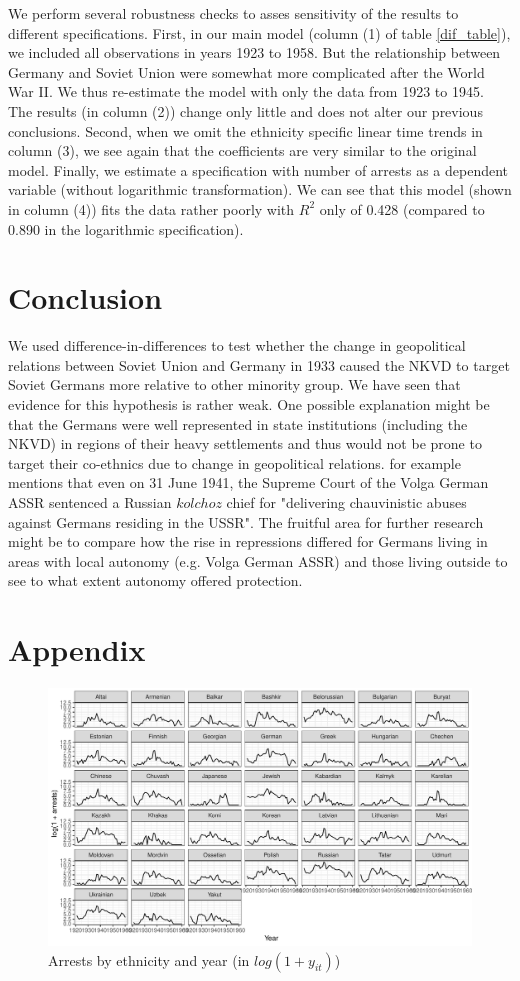 \documentclass[11pt]{article}
\begin{document}
We perform several robustness checks to asses sensitivity of the results to different specifications. First, in our main model (column (1) of table \ref{dif_table}), we included all observations in years 1923 to 1958. But the relationship between Germany and Soviet Union were somewhat more complicated after the World War II. We thus re-estimate the model with only the data from 1923 to 1945. The results (in column (2)) change only little and does not alter our previous conclusions. Second, when we omit the ethnicity specific linear time trends in column (3), we see again that the coefficients are very similar to the original model. 
Finally, we estimate a specification with number of arrests as a dependent variable (without logarithmic transformation). We can see that this model (shown in column (4)) fits the data rather poorly with  $R^2$ only of 0.428 (compared to 0.890 in the logarithmic specification). 
\section{Conclusion}
We used difference-in-differences to test whether the change in geopolitical relations between Soviet Union and Germany in 1933 caused the NKVD to target Soviet Germans more relative to other minority group. We have seen that evidence for this hypothesis is rather weak. One possible explanation might be that the Germans were well represented in state institutions (including the NKVD) in regions of their heavy settlements and thus would not be prone to target their co-ethnics due to change in geopolitical relations. \citet[p. 126]{polian_against_2003} for example mentions that even on 31 June 1941, the Supreme Court of the Volga German ASSR sentenced a Russian $kolchoz$ chief for "delivering chauvinistic abuses against Germans residing in the USSR". The fruitful area for further research might be to compare how the rise in repressions differed for Germans living in areas with local autonomy (e.g. Volga German ASSR) and those living outside to see to what extent autonomy offered protection. 



\newpage
\section*{Appendix}


\begin{figure}[h]
\centering
\includegraphics[width=1.2\textwidth]{plots/arrests_by_ethnicity.pdf}
\caption{Arrests by ethnicity and year (in $log(1 + y_{it})$)}
\label{fig:universe}
\end{figure}
\newpage

\thispagestyle{empty}
\end{document}
